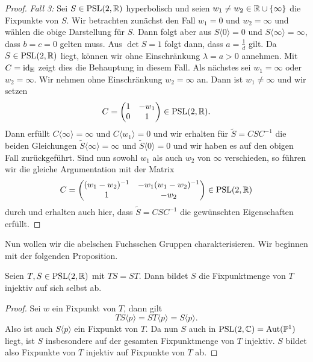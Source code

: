 \begin{proof}
  \emph{Fall 3:} Sei $S \in \operatorname{PSL}(2, \mathbb{R})$ hyperbolisch und seien $w_1
  \neq w_2 \in \mathbb{R} \cup \{\infty\}$ die Fixpunkte von $S$. Wir
  betrachten zunächst den Fall $w_1 = 0$ und $w_2 = \infty$ und wählen
  die obige Darstellung für $S$. Dann folgt aber aus $S\langle 0
  \rangle = 0$ und $S\langle \infty \rangle = \infty$, dass $b = c = 0$
  gelten muss. Aus $\det S = 1$ folgt dann, dass $a = \frac{1}{d}$
  gilt. Da $S \in \operatorname{PSL}(2,\mathbb{R})$ liegt, können wir ohne Einschränkung
  $\lambda = a > 0$ annehmen. Mit $C = \operatorname{id}_{\mathbb{H}}$ zeigt dies die
  Behauptung in diesem Fall. Als nächstes sei $w_1 = \infty$ oder $w_2 = \infty$. Wir
  nehmen ohne Einschränkung $w_2 = \infty$ an. Dann ist $w_1 \neq
  \infty$ und wir setzen
  \[
  C =
  \begin{pmatrix}
    1 & - w_1\\
    0 & 1
  \end{pmatrix}
  \in \operatorname{PSL}(2, \mathbb{R}).
  \]
  Dann erfüllt $C\langle \infty \rangle = \infty$ und $C\langle w_1
  \rangle = 0$ und wir erhalten für $\tilde S = C S C^{-1}$ die beiden
  Gleichungen $\tilde S \langle \infty \rangle = \infty$ und $\tilde S
  \langle 0 \rangle = 0$ und wir haben es auf den obigen Fall
  zurückgeführt. Sind nun sowohl $w_1$ als auch $w_2$ von $\infty$
  verschieden, so führen wir die gleiche Argumentation mit der Matrix
  \[
  C =
  \begin{pmatrix}
    (w_1 - w_2)^{-1} & - w_1(w_1-w_2)^{-1}\\
    1 & -w_2
  \end{pmatrix}
  \in \operatorname{PSL}(2, \mathbb{R})
  \]
  durch und erhalten auch hier, dass $\tilde S = C S C^{-1}$ die
  gewünschten Eigenschaften erfüllt.
\end{proof}

Nun wollen wir die abelschen Fuchsschen Gruppen charakterisieren. Wir
beginnen mit der folgenden Proposition.

\begin{prop}
  \label{prop:komm-fix}
  Seien $T, S \in \operatorname{PSL}(2, \mathbb{R})$ mit $TS = ST$. Dann bildet $S$ die
  Fixpunktmenge von $T$ injektiv auf sich selbst ab.
\end{prop}

\begin{proof}
  Sei $w$ ein Fixpunkt von $T$, dann gilt
  \[
  TS \langle p \rangle = ST\langle p \rangle = S\langle p \rangle.
  \]
  Also ist auch $S\langle p \rangle$ ein Fixpunkt von $T$. Da nun $S$
  auch in $\operatorname{PSL}(2, \mathbb{C}) = \operatorname{Aut}(\mathbb{P}^1)$ liegt, ist $S$ insbesondere auf
  der gesamten Fixpunktmenge von $T$ injektiv. $S$ bildet also
  Fixpunkte von $T$ injektiv auf Fixpunkte von $T$ ab.
\end{proof}

